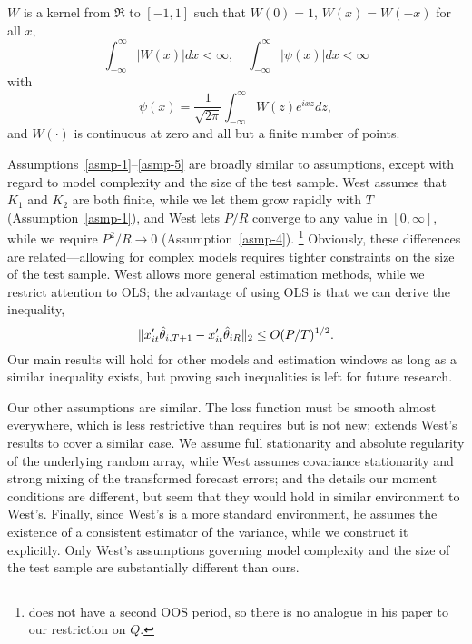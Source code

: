 \documentclass[12pt]{article}
\begin{document}
\begin{asmp}
  \label{asmp-5} $W$ is a kernel from
$\Re$ to $[-1,1]$ such that $W(0) = 1$, $W(x) = W(-x)$ for all $x$,
\begin{equation*}
  \int_{-\infty}^{\infty} \lvert W(x) \rvert dx < \infty, \quad
  \int_{-\infty}^{\infty} \lvert \psi(x) \rvert dx < \infty
\end{equation*}
with
\begin{equation*}
  \psi(x) = \frac1{\sqrt{2\pi}} \int_{-\infty}^{\infty} W(z) e^{ixz}dz,
\end{equation*}
and $W(\cdot)$ is continuous at zero and all but a finite number of
points.
\end{asmp}

Assumptions~\ref{asmp-1}--\ref{asmp-5} are broadly similar to
 assumptions, except with regard to model complexity
and the size of the test sample.  West assumes that $K_1$ and $K_2$
are both finite, while we let them grow rapidly with $T$
(Assumption~\ref{asmp-1}), and West lets $P/R$ converge to any value
in $[0,\infty]$, while we require $P^2/R \to 0$
(Assumption~\ref{asmp-4}).%
\footnote{\citet{Wes:96} does not have a
  second OOS period, so there is no analogue in his paper to our
  restriction on $Q$.} %
Obviously, these differences are
related---allowing for complex models requires tighter constraints on
the size of the test sample.  West allows more general estimation
methods, while we restrict attention to OLS; the advantage of using
OLS is that we can derive the inequality,
\begin{equation*}
  \| x_{it}'\hat\theta_{i,T+1} - x_{it}'\hat\theta_{iR} \|_2 \leq O(P/T)^{1/2}.
\end{equation*}
Our main results will hold for other models and estimation windows as
long as a similar inequality exists, but proving such inequalities is
left for future research.

Our other assumptions are similar.  The loss function must be smooth
almost everywhere, which is less restrictive than \citet{Wes:96}
requires but is not new; \citet{Mcc:00} extends West's results to
cover a similar case. We assume full stationarity and absolute
regularity of the underlying random array, while West assumes
covariance stationarity and strong mixing of the transformed forecast
errors; and the details our moment conditions are different, but seem
that they would hold in similar environment to West's.  Finally, since
West's is a more standard environment, he assumes the existence of a
consistent estimator of the variance, while we construct it
explicitly.  Only West's assumptions governing model complexity and
the size of the test sample are substantially different than ours.
\end{document}
